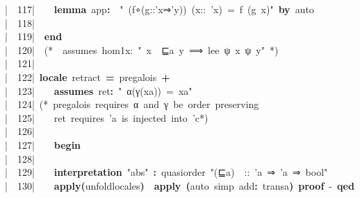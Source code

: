 \documentclass{article}
\newcommand{\syntaxCOMMENTA}[1]{\textcolor[rgb]{0.8,0.0,0.0}{#1}}
\newcommand{\syntaxKEYWORDA}[1]{\textcolor[rgb]{0.0,0.4,0.6}{\textbf{#1}}}
\newcommand{\syntaxKEYWORDB}[1]{\textcolor[rgb]{0.0,0.6,0.4}{\textbf{#1}}}
\newcommand{\syntaxLITERALA}[1]{\textcolor[rgb]{1.0,0.0,0.8}{#1}}
\newcommand{\syntaxOPERATOR}[1]{\textcolor[rgb]{0.0,0.0,0.0}{\textbf{#1}}}
\newcommand{\syntaxCOMMENTA}[1]{\textcolor[rgb]{0.8,0.0,0.0}{#1}}
\newcommand{\syntaxKEYWORDA}[1]{\textcolor[rgb]{0.0,0.4,0.6}{\textbf{#1}}}
\newcommand{\syntaxKEYWORDB}[1]{\textcolor[rgb]{0.0,0.6,0.4}{\textbf{#1}}}
\newcommand{\syntaxLITERALA}[1]{\textcolor[rgb]{1.0,0.0,0.8}{#1}}
\newcommand{\syntaxOPERATOR}[1]{\textcolor[rgb]{0.0,0.0,0.0}{\textbf{#1}}}
\newcommand{\syntaxCOMMENTA}[1]{\textcolor[rgb]{0.8,0.0,0.0}{#1}}
\newcommand{\syntaxKEYWORDA}[1]{\textcolor[rgb]{0.0,0.4,0.6}{\textbf{#1}}}
\newcommand{\syntaxKEYWORDB}[1]{\textcolor[rgb]{0.0,0.6,0.4}{\textbf{#1}}}
\newcommand{\syntaxLITERALA}[1]{\textcolor[rgb]{1.0,0.0,0.8}{#1}}
\newcommand{\syntaxOPERATOR}[1]{\textcolor[rgb]{0.0,0.0,0.0}{\textbf{#1}}}
\newcommand{\syntaxCOMMENTA}[1]{\textcolor[rgb]{0.8,0.0,0.0}{\textbf{#1}}}
\newcommand{\syntaxKEYWORDA}[1]{\textcolor[rgb]{0.0,0.4,0.6}{#1}}
\newcommand{\syntaxKEYWORDB}[1]{\textcolor[rgb]{0.0,0.6,0.4}{#1}}
\newcommand{\syntaxLITERALA}[1]{\textcolor[rgb]{1.0,0.0,0.8}{\textbf{#1}}}
\newcommand{\syntaxOPERATOR}[1]{\textcolor[rgb]{0.0,0.0,0.0}{#1}}
\newcommand{\syntaxCOMMENTA}[1]{\textcolor[rgb]{0.8,0.0,0.0}{#1}}
\newcommand{\syntaxKEYWORDA}[1]{\textcolor[rgb]{0.0,0.4,0.6}{\textbf{#1}}}
\newcommand{\syntaxKEYWORDB}[1]{\textcolor[rgb]{0.0,0.6,0.4}{\textbf{#1}}}
\newcommand{\syntaxLITERALA}[1]{\textcolor[rgb]{1.0,0.0,0.8}{#1}}
\newcommand{\syntaxOPERATOR}[1]{\textcolor[rgb]{0.0,0.0,0.0}{\textbf{#1}}}
\newcommand{\syntaxCOMMENTA}[1]{\textcolor[rgb]{0.8,0.0,0.0}{#1}}
\newcommand{\syntaxKEYWORDA}[1]{\textcolor[rgb]{0.0,0.4,0.6}{\textbf{#1}}}
\newcommand{\syntaxKEYWORDB}[1]{\textcolor[rgb]{0.0,0.6,0.4}{\textbf{#1}}}
\newcommand{\syntaxLITERALA}[1]{\textcolor[rgb]{1.0,0.0,0.8}{#1}}
\newcommand{\syntaxOPERATOR}[1]{\textcolor[rgb]{0.0,0.0,0.0}{\textbf{#1}}}
\newcommand{\syntaxCOMMENTA}[1]{\textcolor[rgb]{0.0,0.0,0.0}{#1}}
\newcommand{\syntaxKEYWORDA}[1]{\textcolor[rgb]{0.0,0.0,0.0}{#1}}
\newcommand{\syntaxKEYWORDB}[1]{\textcolor[rgb]{0.0,0.0,0.0}{#1}}
\newcommand{\gutter}[1]{\textcolor[rgb]{0,0,0}{{|}#1}}
\newcommand{\gutterH}[1]{\textcolor[rgb]{1,0,0}{{|}#1}}
\begin{document}
\gutter{\ \ 117{|}\ }{\ }{\ }{\ }\syntaxKEYWORDA{lemma}{\ }app\syntaxOPERATOR{:}{\ }{\ }\syntaxLITERALA{"{\ }(f∘(g::'x⇒'y)){\ }(x::{\ }'x){\ }={\ }f{\ }(g{\ }x)"}{\ }\syntaxKEYWORDA{by}{\ }auto\hspace*{\fill}\\
\gutter{\ \ 118{|}\ }{\ }{\ }{\ }\hspace*{\fill}\\
\gutter{\ \ 119{|}\ }{\ }\syntaxKEYWORDB{end}\hspace*{\fill}\\
\gutterH{\ \ 120{|}\ }{\ }\syntaxCOMMENTA{(*{\ }{\ }assumes{\ }hom1x:{\ }"{\ }x{\ }{\ }⊑a{\ }y{\ }⟹{\ }lee{\ }ψ{\ }x{\ }ψ{\ }y"{\ }*)}\hspace*{\fill}\\
\gutter{\ \ 121{|}\ }\hspace*{\fill}\\
\gutter{\ \ 122{|}\ }\syntaxKEYWORDA{locale}{\ }retract{\ }\syntaxOPERATOR{=}{\ }pre\usebox{\underscorebox}galois{\ }\syntaxOPERATOR{+}\hspace*{\fill}\\
\gutter{\ \ 123{|}\ }{\ }{\ }{\ }\syntaxKEYWORDB{assumes}{\ }ret\syntaxOPERATOR{:}{\ }\syntaxLITERALA{"{\ }α(γ(xa)){\ }={\ }xa"}\hspace*{\fill}\\
\gutter{\ \ 124{|}\ }\syntaxCOMMENTA{(*{\ }pre\usebox{\underscorebox}galois{\ }requires{\ }α{\ }and{\ }γ{\ }be{\ }order{\ }preserving}\hspace*{\fill}\\
\gutterH{\ \ 125{|}\ }\syntaxCOMMENTA{{\ }{\ }{\ }ret{\ }requires{\ }'a{\ }is{\ }injected{\ }into{\ }'c*)}\hspace*{\fill}\\
\gutter{\ \ 126{|}\ }{\ }{\ }{\ }{\ }\hspace*{\fill}\\
\gutter{\ \ 127{|}\ }{\ }{\ }{\ }\syntaxKEYWORDB{begin}{\ }\hspace*{\fill}\\
\gutter{\ \ 128{|}\ }{\ }{\ }{\ }{\ }\hspace*{\fill}\\
\gutter{\ \ 129{|}\ }{\ }{\ }{\ }\syntaxKEYWORDA{interpretation}{\ }\syntaxLITERALA{"abs"}{\ }\syntaxOPERATOR{:}{\ }quasi\usebox{\underscorebox}order{\ }\syntaxLITERALA{"(⊑a){\ }{\ }::{\ }'a{\ }⇒{\ }'a{\ }⇒{\ }bool"}{\ }\hspace*{\fill}\\
\gutterH{\ \ 130{|}\ }{\ }{\ }{\ }\syntaxKEYWORDA{apply}\syntaxOPERATOR{(}unfold\usebox{\underscorebox}locales\syntaxOPERATOR{)}{\ }{\ }\syntaxKEYWORDA{apply}{\ }\syntaxOPERATOR{(}auto{\ }simp{\ }add\syntaxOPERATOR{:}{\ }transa\syntaxOPERATOR{)}{\ }\syntaxKEYWORDA{proof}{\ }{-}{\ }\syntaxKEYWORDA{qed}\hspace*{\fill}\\
\end{document}

